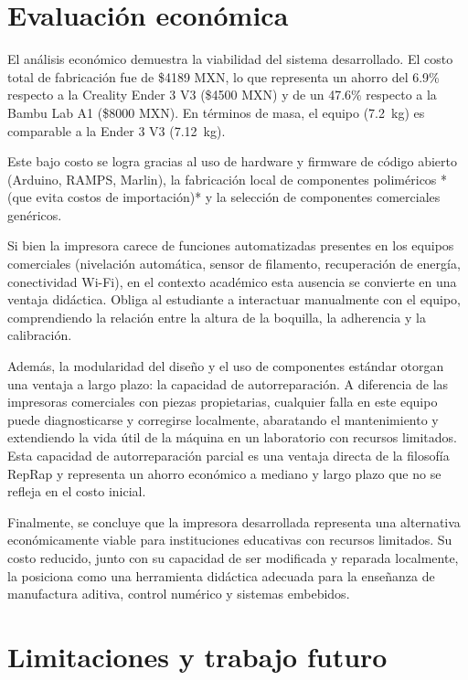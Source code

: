 \section{Evaluación económica}
\label{sec:discusion_economica}

El análisis económico demuestra la viabilidad del sistema desarrollado. El costo total de fabricación fue de \$4189 MXN, lo que representa un ahorro del 6.9\% respecto a la Creality Ender 3 V3 (\$4500 MXN) y de un 47.6\% respecto a la Bambu Lab A1 (\$8000 MXN). En términos de masa, el equipo (\qty{7.2}{\kg}) es comparable a la Ender 3 V3 (\qty{7.12}{\kg}).

Este bajo costo se logra gracias al uso de hardware y firmware de código abierto (Arduino, RAMPS, Marlin), la fabricación local de componentes poliméricos *(que evita costos de importación)* y la selección de componentes comerciales genéricos. 

Si bien la impresora carece de funciones automatizadas presentes en los equipos comerciales (nivelación automática, sensor de filamento, recuperación de energía, conectividad Wi-Fi), en el contexto académico esta ausencia se convierte en una ventaja didáctica. Obliga al estudiante a interactuar manualmente con el equipo, comprendiendo la relación entre la altura de la boquilla, la adherencia y la calibración. 

Además, la modularidad del diseño y el uso de componentes estándar otorgan una ventaja a largo plazo: la capacidad de autorreparación. A diferencia de las impresoras comerciales con piezas propietarias, cualquier falla en este equipo puede diagnosticarse y corregirse localmente, abaratando el mantenimiento y extendiendo la vida útil de la máquina en un laboratorio con recursos limitados. Esta capacidad de autorreparación parcial es una ventaja directa de la filosofía RepRap \cite{jones2011reprap} y representa un ahorro económico a mediano y largo plazo que no se refleja en el costo inicial.

Finalmente, se concluye que la impresora desarrollada representa una alternativa económicamente viable para instituciones educativas con recursos limitados. Su costo reducido, junto con su capacidad de ser modificada y reparada localmente, la posiciona como una herramienta didáctica adecuada para la enseñanza de manufactura aditiva, control numérico y sistemas embebidos.

\section{Limitaciones y trabajo futuro}
\label{sec:discusion_limitaciones}

